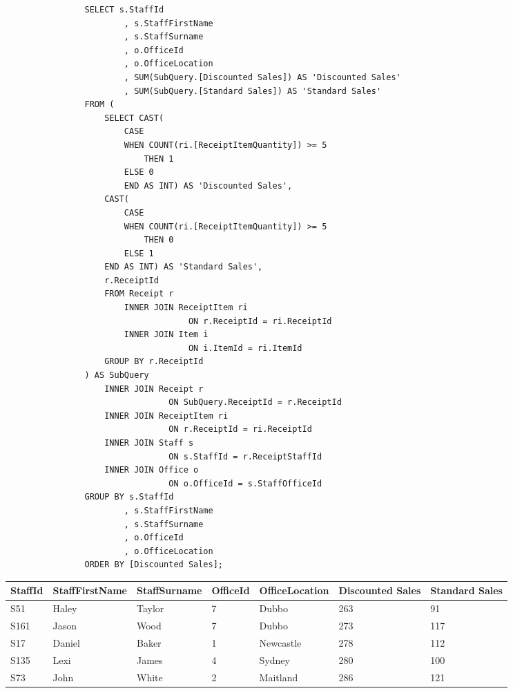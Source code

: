 \documentclass{article}
\begin{document}
            \begin{lstlisting}
				SELECT s.StaffId
						, s.StaffFirstName
						, s.StaffSurname
						, o.OfficeId
						, o.OfficeLocation
						, SUM(SubQuery.[Discounted Sales]) AS 'Discounted Sales'
						, SUM(SubQuery.[Standard Sales]) AS 'Standard Sales'
				FROM (
					SELECT CAST(
						CASE
						WHEN COUNT(ri.[ReceiptItemQuantity]) >= 5
							THEN 1
						ELSE 0
						END AS INT) AS 'Discounted Sales',
					CAST(
						CASE
						WHEN COUNT(ri.[ReceiptItemQuantity]) >= 5
							THEN 0
						ELSE 1
					END AS INT) AS 'Standard Sales',
					r.ReceiptId
					FROM Receipt r
						INNER JOIN ReceiptItem ri
									 ON r.ReceiptId = ri.ReceiptId
						INNER JOIN Item i
									 ON i.ItemId = ri.ItemId
					GROUP BY r.ReceiptId
				) AS SubQuery
					INNER JOIN Receipt r
								 ON SubQuery.ReceiptId = r.ReceiptId
					INNER JOIN ReceiptItem ri
								 ON r.ReceiptId = ri.ReceiptId
					INNER JOIN Staff s
								 ON s.StaffId = r.ReceiptStaffId
					INNER JOIN Office o
								 ON o.OfficeId = s.StaffOfficeId
				GROUP BY s.StaffId
						, s.StaffFirstName
						, s.StaffSurname
						, o.OfficeId
						, o.OfficeLocation
				ORDER BY [Discounted Sales];
            \end{lstlisting}

            \begin{table}[H]
                \centering
                \begin{tabular}{|l|l|l|l|l|l|l|}
                \hline
                StaffId & StaffFirstName & StaffSurname & OfficeId & OfficeLocation & Discounted Sales & Standard Sales \\ \hline
                S51     & Haley          & Taylor       & 7        & Dubbo          & 263              & 91             \\ \hline
                S161    & Jason          & Wood         & 7        & Dubbo          & 273              & 117            \\ \hline
                S17     & Daniel         & Baker        & 1        & Newcastle      & 278              & 112            \\ \hline
                S135    & Lexi           & James        & 4        & Sydney         & 280              & 100            \\ \hline
                S73     & John           & White        & 2        & Maitland       & 286              & 121            \\ \hline
                \end{tabular}
                \end{table}
\end{document}
